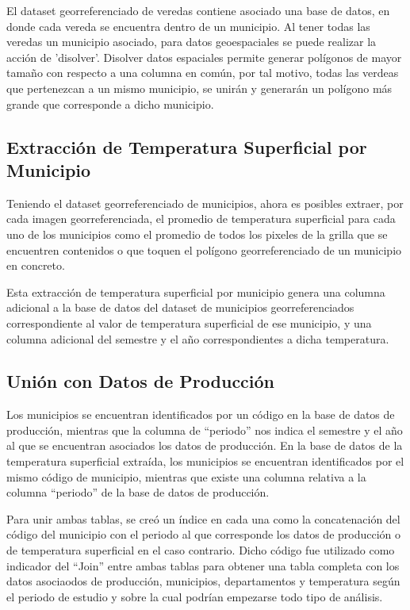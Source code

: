 \documentclass[12pt, spanish]{article}
\begin{document}
El dataset georreferenciado de veredas contiene asociado una base de datos, en donde cada vereda se encuentra dentro de un municipio. Al tener todas las veredas un municipio asociado, para datos geoespaciales se puede realizar la acción de 'disolver'. Disolver datos espaciales permite generar polígonos de mayor tamaño con respecto a una columna en común, por tal motivo, todas las verdeas que pertenezcan a un mismo municipio, se unirán y generarán un polígono más grande que corresponde a dicho municipio.

\subsection{Extracción de Temperatura Superficial por Municipio}

Teniendo el dataset georreferenciado de municipios, ahora es posibles extraer, por cada imagen georreferenciada, el promedio de temperatura superficial para cada uno de los municipios como el promedio de todos los pixeles de la grilla que se encuentren contenidos o que toquen el polígono georreferenciado de un municipio en concreto.

Esta extracción de temperatura superficial por municipio genera una columna adicional a la base de datos del dataset de municipios georreferenciados correspondiente al valor de temperatura superficial de ese municipio, y una columna adicional del semestre y el año correspondientes a dicha temperatura.

\subsection{Unión con Datos de Producción}

Los municipios se encuentran identificados por un código en la base de datos de producción, mientras que la columna de ``periodo'' nos indica el semestre y el año al que se encuentran asociados los datos de producción. En la base de datos de la temperatura superficial extraída, los municipios se encuentran identificados por el mismo código de municipio, mientras que existe una columna relativa a la columna ``periodo''  de la base de datos de producción.

Para unir ambas tablas, se creó un índice en cada una como la concatenación del código del municipio con el periodo al que corresponde los datos de producción o de temperatura superficial en el caso contrario. Dicho código fue utilizado como indicador del ``Join''  entre ambas tablas para obtener una tabla completa con los datos asociaodos de producción, municipios, departamentos y temperatura según el periodo de estudio y sobre la cual podrían empezarse todo tipo de análisis.
\end{document}
